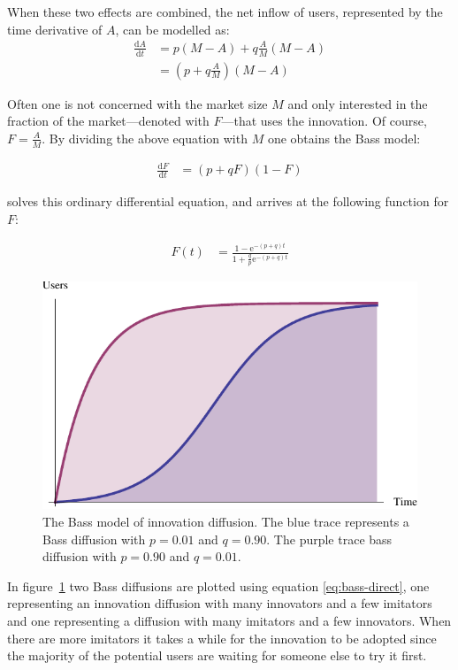 \documentclass[smallextended,final]{svjour3}
\newcommand{\nd}[2]{\frac{\mathrm{d} #1}{\mathrm{d} #2}}
\newcommand{\e}{\mathrm{e}}
\begin{document}
When these two effects are combined, the net inflow of users, represented by the time derivative of $A$, can be modelled as:
\begin{align*}
\nd{A}{t} &= p(M - A) + q\frac{A}{M}(M - A) \\
&= \left(p + q\frac{A}{M} \right)(M - A)
\end{align*}

Often one is not concerned with the market size $M$ and only interested in the fraction of the market---denoted with $F$---that uses the innovation. Of course, $F=\frac{A}{M}$. By dividing the above equation with $M$ one obtains the Bass model:

\begin{align}\label{eq:bass-ode}
\nd{F}{t} &= \left(p + q F\right)(1 - F)
\end{align}

\citet{bass69} solves this ordinary differential equation, and arrives at the following function for $F$:

\begin{align}\label{eq:bass-direct}
F(t) &= \frac{1 - \e^{-(p+q)t}}{1+\frac{q}{p}\e^{-(p+q)t}}
\end{align}

\begin{figure}
\small\centering
\includegraphics[width=\linewidth]{Bass.pdf}
\caption[Bass model of innovation diffusion]{The Bass model of innovation diffusion. The blue trace represents a Bass diffusion with $p=0.01$ and $q=0.90$. The purple trace bass diffusion with $p=0.90$ and $q=0.01$.}
\label{fig:bass}
\end{figure}

In figure~\ref{fig:bass} two Bass diffusions are plotted using equation \eqref{eq:bass-direct}, one representing an innovation diffusion with many innovators and a few imitators and one representing a diffusion with many imitators and a few innovators. When there are more imitators it takes a while for the innovation to be adopted since the majority of the potential users are waiting for someone else to try it first.
\end{document}
